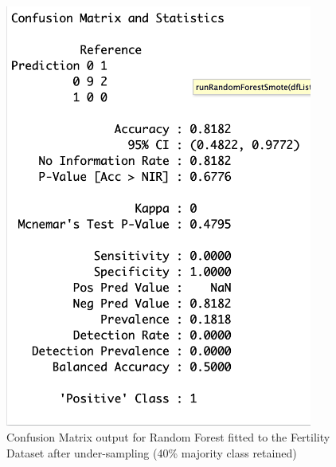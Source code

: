 \begin{figure}[!htbp]
    \centering
    \begin{minipage}{0.45\textwidth}
        \centering
        \includegraphics[width=0.9\textwidth]{ThesisTemplate/appendix/images/Chapter5Appendix/ConfusionMatrix40/Fertility.png}
        \caption{Confusion Matrix output for Random Forest fitted to the Fertility Dataset after under-sampling (40\% majority class retained)}
        \label{fig:my_label}
    \end{minipage}\hfill
    \begin{minipage}{0.45\textwidth}
        \centering

\end{minipage}
\end{figure}
